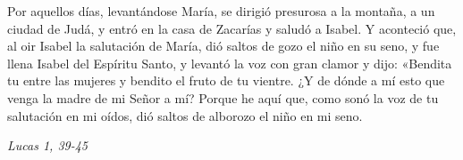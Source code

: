 \documentclass[../../devocionario.tex]{subfiles}
\begin{document}
    Por aquellos días, levantándose María, se dirigió presurosa a la montaña, a un ciudad de Judá, y entró en la casa de Zacarías y saludó a Isabel. 
    Y aconteció que, al oir Isabel la salutación de María, dió saltos de gozo el niño en su seno, y fue llena Isabel del Espíritu Santo, 
    y levantó la voz con gran clamor y dijo: «Bendita tu entre las mujeres y bendito el fruto de tu vientre. ¿Y de dónde a mí esto que venga la madre de mi Señor a mí? 
    Porque he aquí que, como sonó la voz de tu salutación en mi oídos, dió saltos de alborozo el niño en mi seno.
    
    \begin{flushright}
        \emph{Lucas 1, 39-45}
    \end{flushright}
\end{document}
